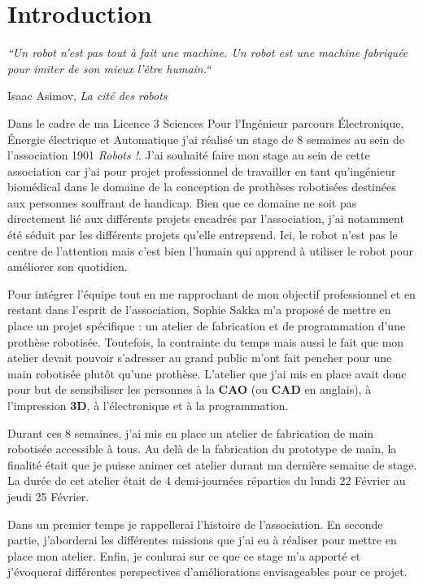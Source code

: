 \section{Introduction}

\begin{center}
\textit{\LARGE ``Un robot n'est pas tout à fait une machine. Un robot est une machine fabriquée pour imiter de son mieux l'être humain.``} 

\huge Isaac Asimov, \textit{La cité des robots}
\end{center}

\vspace{0.8cm}
Dans le cadre de ma Licence 3 Sciences Pour l'Ingénieur parcours \'Electronique, \'Energie électrique et Automatique j'ai réalisé un stage de 8 semaines au sein de l'association 1901 \textit{Robots !}. J'ai souhaité faire mon stage au sein de cette association car j'ai pour projet professionnel de travailler en tant qu'ingénieur biomédical dans le domaine de la conception de prothèses robotisées destinées aux personnes souffrant de handicap. Bien que ce domaine ne soit pas directement lié aux différents projets encadrés par l'association, j'ai notamment été séduit par les différents projets qu'elle entreprend. Ici, le robot n'est pas le centre de l'attention mais c'est bien l'humain qui apprend à utiliser le robot pour améliorer son quotidien.


\vspace{0.5cm}
Pour intégrer l'équipe tout en me rapprochant de mon objectif professionnel et en restant dans l'esprit de l'association, Sophie Sakka m'a proposé de mettre en place un projet spécifique : un atelier de fabrication et de programmation d'une prothèse robotisée. Toutefois, la contrainte du temps mais aussi le fait que mon atelier devait pouvoir s'adresser au grand public m'ont fait pencher pour une main robotisée plutôt qu'une prothèse. L'atelier que j'ai mis en place avait donc pour but de sensibiliser les personnes à la \textbf{CAO} (ou \textbf{CAD} en anglais), à l'impression \textbf{3D}, à l'électronique et à la programmation.


\vspace{0.5cm}
Durant ces 8 semaines, j'ai mis en place un atelier de fabrication de main robotisée accessible à tous. Au delà de la fabrication du prototype de main, la finalité était que je puisse animer cet atelier durant ma dernière semaine de stage. La durée de cet atelier était de 4 demi-journées réparties du lundi 22 Février au jeudi 25 Février.


\vspace{0.5cm}
Dans un premier temps je rappellerai l'histoire de l'association. En seconde partie, j'aborderai les différentes missions que j'ai eu à réaliser pour mettre en place mon atelier. Enfin, je conlurai sur ce que ce stage m'a apporté et j'évoquerai différentes perspectives d'améliorations envisageables pour ce projet.